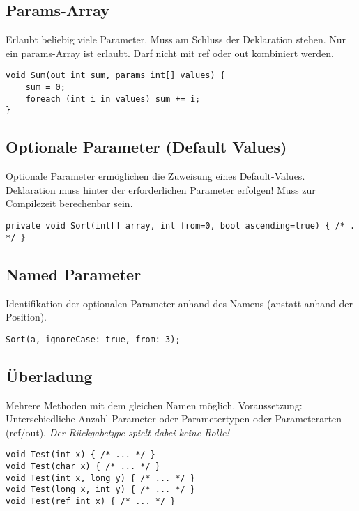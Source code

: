 \subsection{Params-Array}
Erlaubt beliebig viele Parameter. Muss am Schluss der Deklaration stehen. Nur ein params-Array ist erlaubt. Darf nicht mit ref oder out kombiniert werden.
\begin{lstlisting}
void Sum(out int sum, params int[] values) {
	sum = 0;
	foreach (int i in values) sum += i; 
} 
\end{lstlisting}

\subsection{Optionale Parameter (Default Values)}
Optionale Parameter ermöglichen die Zuweisung eines Default-Values. Deklaration muss hinter der erforderlichen Parameter erfolgen! Muss zur Compilezeit berechenbar sein.
\begin{lstlisting}
private void Sort(int[] array, int from=0, bool ascending=true) { /* . */ }
\end{lstlisting}

\subsection{Named Parameter}
Identifikation der optionalen Parameter anhand des Namens (anstatt anhand der Position). 
\begin{lstlisting}
Sort(a, ignoreCase: true, from: 3);
\end{lstlisting}

\subsection{Überladung}
Mehrere Methoden mit dem gleichen Namen möglich. Voraussetzung: Unterschiedliche Anzahl Parameter oder Parametertypen oder Parameterarten (ref/out). \textit{Der Rückgabetype spielt dabei keine Rolle!}
\begin{lstlisting}
void Test(int x) { /* ... */ } 
void Test(char x) { /* ... */ } 
void Test(int x, long y) { /* ... */ } 
void Test(long x, int y) { /* ... */ } 
void Test(ref int x) { /* ... */ }
\end{lstlisting}



\pagebreak
